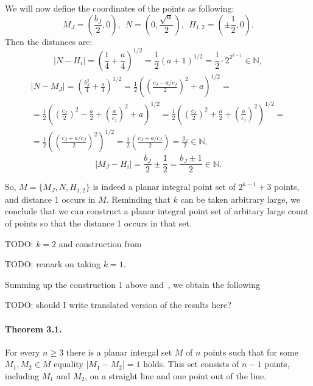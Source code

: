 \documentclass[a4paper,14pt]{article} %
\theoremstyle{plain}
\begin{document}
We will now define the coordinates of the points as following:
\begin{equation}
	M_J =\left(\frac{b_J}{2}, 0\right)
	,
	~~
	N   =\left(0, \frac{\sqrt{a}}{2}\right)
	,
	~~
	H_{1,2} = \left(\pm\frac{1}{2}, 0\right)
	.
\end{equation}
Then the distances are:
\begin{equation}
	|N - H_i|
	=
	\left(\frac{1}{4} + \frac{a}{4}\right)^{1/2}
	=
	\frac{1}{2}(a + 1)^{1/2}
	=
	\frac{1}{2}\cdot 2^{2^{k-1}}
	\in\mathbb{N}
	,
\end{equation}
\begin{multline}
	|N - M_J|
	=
	\left(\frac{b_J^2}{4} + \frac{a}{4}\right)^{1/2}
	=
	\frac{1}{2}\left(\left(\frac{c_J - a/c_J}{2}\right)^2 + a\right)^{1/2}
	=
	\\=
	\frac{1}{2}\left( \left(\frac{c_J}{2}\right)^2 - \frac{a}{2} + \left(\frac{a}{c_j}\right)^2 + a\right)^{1/2}
	=
	\frac{1}{2}\left( \left(\frac{c_J}{2}\right)^2 + \frac{a}{2} + \left(\frac{a}{c_j}\right)^2    \right)^{1/2}
	=
	\\=
	\frac{1}{2}\left(\left(\frac{c_J + a/c_J}{2}\right)^2\right)^{1/2}
	=
	\frac{1}{2}\left(\frac{c_J + a/c_J}{2}\right)
	=
	\frac{g_J}{2}
	\in\mathbb{N}
	,
\end{multline}
\begin{equation}
	|M_J - H_i|
	=
	\frac{b_J}{2} \pm \frac{1}{2}
	=
	\frac{b_J \pm 1}{2}
	\in\mathbb{N}
	.
\end{equation}


So, $M = \{ M_J, N, H_{1,2}\}$ is indeed a planar integral point set of $2^{k-1}+3$ points,
and distance 1 occurs in $M$.
Reminding that $k$ can be taken arbitrary large, we conclude that we can construct
a planar integral point set of arbitary large count of points so that the distance 1 occurs in that set.


TODO: $k=2$ and construction from~\cite{harborth1993upper}

TODO: remark on taking $k=1$.

Summing up the construction 1 above and~\cite[lemma 3 and proposition 6]{our-vmmsh-2018},
we obtain the following

TODO: should I write translated version of the results here?

\paragraph{Theorem 3.1.}
For every $n\geq 3$ there is a planar intergal set $M$ of $n$ points
such that for some $M_1,M_2 \in M$ equality $|M_1 - M_2|=1$ holds.
This set consists of $n-1$ points, including $M_1$ and $M_2$, on a straight line and one point out of the line.
\end{document}
